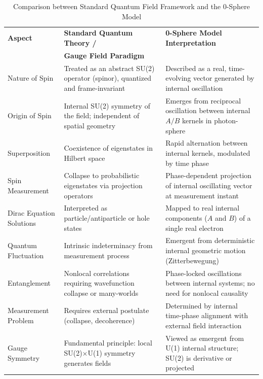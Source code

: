 \documentclass[%
 reprint,
 amsmath,amssymb,
 aps,
]{revtex4-1}
\numberwithin{equation}{section}%
\begin{document}
\begin{table}[t!]
\caption{Comparison between Standard Quantum Field Framework and the 0-Sphere Model}
\label{tab:comparison_extended}
\renewcommand{\arraystretch}{1.3}
\begin{tabular}{p{4.8cm}p{6.2cm}p{6.2cm}}
\toprule
\textbf{Aspect} & \textbf{Standard Quantum Theory /} & \textbf{0-Sphere Model Interpretation} \\
& \textbf{Gauge Field Paradigm} & \\
\midrule
Nature of Spin & Treated as an abstract SU(2) operator (spinor), quantized and frame-invariant & Described as a real, time-evolving vector generated by internal oscillation \\
\addlinespace[0.3cm]
Origin of Spin & Internal SU(2) symmetry of the field; independent of spatial geometry & Emerges from reciprocal oscillation between internal $A/B$ kernels in photon-sphere \\
\addlinespace[0.3cm]
Superposition & Coexistence of eigenstates in Hilbert space & Rapid alternation between internal kernels, modulated by time phase \\
\addlinespace[0.3cm]
Spin Measurement & Collapse to probabilistic eigenstates via projection operators & Phase-dependent projection of internal oscillating vector at measurement instant \\
\addlinespace[0.3cm]
Dirac Equation Solutions & Interpreted as particle/antiparticle or hole states & Mapped to real internal components ($A$ and $B$) of a single real electron \\
\addlinespace[0.3cm]
Quantum Fluctuation & Intrinsic indeterminacy from measurement process & Emergent from deterministic internal geometric motion (Zitterbewegung) \\
\addlinespace[0.3cm]
Entanglement & Nonlocal correlations requiring wavefunction collapse or many-worlds & Phase-locked oscillations between internal systems; no need for nonlocal causality \\
\addlinespace[0.3cm]
Measurement Problem & Requires external postulate (collapse, decoherence) & Determined by internal time-phase alignment with external field interaction \\
\addlinespace[0.3cm]
Gauge Symmetry & Fundamental principle: local SU(2)$\times$U(1) symmetry generates fields & Viewed as emergent from U(1) internal structure; SU(2) is derivative or projected \\

\end{tabular}
\end{table}
\end{document}
